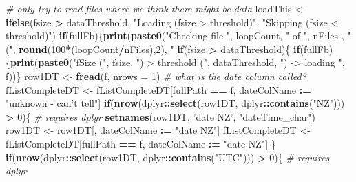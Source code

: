 \documentclass[]{article}
\newenvironment{Shaded}{\begin{snugshade}}{\end{snugshade}}
\newcommand{\KeywordTok}[1]{\textcolor[rgb]{0.13,0.29,0.53}{\textbf{#1}}}
\newcommand{\DataTypeTok}[1]{\textcolor[rgb]{0.13,0.29,0.53}{#1}}
\newcommand{\DecValTok}[1]{\textcolor[rgb]{0.00,0.00,0.81}{#1}}
\newcommand{\StringTok}[1]{\textcolor[rgb]{0.31,0.60,0.02}{#1}}
\newcommand{\CommentTok}[1]{\textcolor[rgb]{0.56,0.35,0.01}{\textit{#1}}}
\newcommand{\ControlFlowTok}[1]{\textcolor[rgb]{0.13,0.29,0.53}{\textbf{#1}}}
\newcommand{\OperatorTok}[1]{\textcolor[rgb]{0.81,0.36,0.00}{\textbf{#1}}}
\newcommand{\ErrorTok}[1]{\textcolor[rgb]{0.64,0.00,0.00}{\textbf{#1}}}
\newcommand{\NormalTok}[1]{#1}
\begin{document}
\begin{Shaded}
\begin{Highlighting}[]
    \CommentTok{# only try to read files where we think there might be data}
\NormalTok{    loadThis <-}\StringTok{ }\KeywordTok{ifelse}\NormalTok{(fsize }\OperatorTok{>}\StringTok{ }\NormalTok{dataThreshold, }\StringTok{"Loading (fsize > threshold)"}\NormalTok{, }\StringTok{"Skipping (fsize < threshold)"}\NormalTok{)}
    \ControlFlowTok{if}\NormalTok{(fullFb)\{}\KeywordTok{print}\NormalTok{(}\KeywordTok{paste0}\NormalTok{(}\StringTok{"Checking file "}\NormalTok{, loopCount, }\StringTok{" of "}\NormalTok{, nFiles ,}
                            \StringTok{" ("}\NormalTok{, }\KeywordTok{round}\NormalTok{(}\DecValTok{100}\OperatorTok{*}\NormalTok{(loopCount}\OperatorTok{/}\NormalTok{nFiles),}\DecValTok{2}\NormalTok{), }\StringTok{"%
    \ControlFlowTok{if}\NormalTok{(fsize }\OperatorTok{>}\StringTok{ }\NormalTok{dataThreshold)\{}
      \ControlFlowTok{if}\NormalTok{(fullFb)\{}\KeywordTok{print}\NormalTok{(}\KeywordTok{paste0}\NormalTok{(}\StringTok{"fSize ("}\NormalTok{, fsize, }\StringTok{") > threshold ("}\NormalTok{, dataThreshold, }\StringTok{") -> loading "}\NormalTok{, f))\}}
\NormalTok{      row1DT <-}\StringTok{ }\KeywordTok{fread}\NormalTok{(f, }\DataTypeTok{nrows =} \DecValTok{1}\NormalTok{)}
      \CommentTok{# what is the date column called?}
\NormalTok{      fListCompleteDT <-}\StringTok{ }\NormalTok{fListCompleteDT[fullPath }\OperatorTok{==}\StringTok{ }\NormalTok{f, dateColName }\OperatorTok{:}\ErrorTok{=}\StringTok{ "unknown - can't tell"}\NormalTok{]}
      \ControlFlowTok{if}\NormalTok{(}\KeywordTok{nrow}\NormalTok{(dplyr}\OperatorTok{::}\KeywordTok{select}\NormalTok{(row1DT, dplyr}\OperatorTok{::}\KeywordTok{contains}\NormalTok{(}\StringTok{"NZ"}\NormalTok{))) }\OperatorTok{>}\StringTok{ }\DecValTok{0}\NormalTok{)\{ }\CommentTok{# requires dplyr}
        \KeywordTok{setnames}\NormalTok{(row1DT, }\StringTok{'date NZ'}\NormalTok{, }\StringTok{"dateTime_char"}\NormalTok{)}
\NormalTok{        row1DT <-}\StringTok{ }\NormalTok{row1DT[, dateColName }\OperatorTok{:}\ErrorTok{=}\StringTok{ "date NZ"}\NormalTok{]}
\NormalTok{        fListCompleteDT <-}\StringTok{ }\NormalTok{fListCompleteDT[fullPath }\OperatorTok{==}\StringTok{ }\NormalTok{f, dateColName }\OperatorTok{:}\ErrorTok{=}\StringTok{ "date NZ"}\NormalTok{]}
\NormalTok{      \} }
      \ControlFlowTok{if}\NormalTok{(}\KeywordTok{nrow}\NormalTok{(dplyr}\OperatorTok{::}\KeywordTok{select}\NormalTok{(row1DT, dplyr}\OperatorTok{::}\KeywordTok{contains}\NormalTok{(}\StringTok{"UTC"}\NormalTok{))) }\OperatorTok{>}\StringTok{ }\DecValTok{0}\NormalTok{)\{ }\CommentTok{# requires dplyr}
}
\end{Highlighting}
\end{Shaded}
\end{document}
